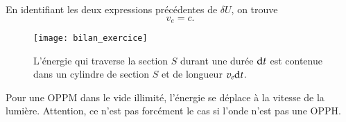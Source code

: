\begin{corrige}
\begin{enumerate}
\begin{enumerate}
			  En identifiant les deux expressions précédentes de 
			  $\delta U$, on trouve 
			  \begin{equation*}
				  \boxed{
				  v_e = c.
			  }
			  \end{equation*}
	     \end{enumerate}
	\end{enumerate}
	\begin{figure}[htpb]
		\centering
		\texttt{[image: bilan\_exercice]}
		\caption{L'énergie qui traverse la section $S$ durant une durée
		$\mathrm{d}t$ est contenue dans un cylindre de section $S$ et de 
		longueur $v_e \mathrm{d}t$.}%
		\label{fig:maxwell_bilan_ex}
	\end{figure}
	\begin{defn}
		Pour une OPPM dans le vide illimité, l'énergie se déplace 
		à la vitesse de la lumière. Attention, ce n'est pas forcément le
		cas si l'onde n'est pas une OPPH.
	\end{defn}
\end{corrige}

